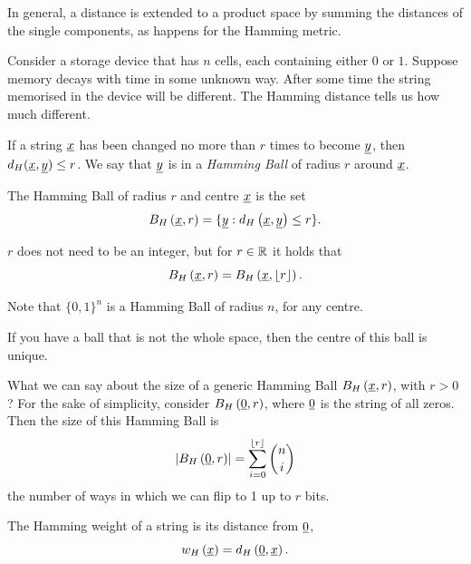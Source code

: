 In general,  a distance is extended to a product space by summing the distances of the single components, as happens for the Hamming metric.

Consider a storage device that has $n$ cells, each containing either $0$ or $1$.
Suppose memory decays with time in some unknown way.
After some time the string memorised in the device will be different.
The Hamming distance tells us how much different.

If a string $\underline{x}$ has been changed no more than $r$ times to become $\underline{y}$, then $d_H(\underline{x}, \underline{y}) \leq r$.
We say that $\underline{y}$ is in a \emph{Hamming Ball} of radius $r$ around $\underline{x}$.

\begin{definition}
	The Hamming Ball of radius $r$ and centre $\underline{x}$ is the set
	\begin{equation}
		B_H\left(\underline{x}, r\right) = \{\underline{y} : d_H \left({\underline{x},\underline{y}}\right) \leq r\}.
	\end{equation}
\end{definition}

\begin{obs}
	$r$ does not need to be an integer, but for $r \in \mathbb{R}$ it holds that
	\begin{equation*}
		B_H\left(\underline{x}, r\right) = B_H\left(\underline{x}, \left\lfloor{r}\right\rfloor\right).
	\end{equation*}
\end{obs}

Note that $\{0,1\}^{n}$ is a Hamming Ball of radius $n$, for any centre.

If you have a ball that is not the whole space, then the centre of this ball is unique.

What we can say about the size of a generic Hamming Ball $B_H\left(\underline{x}, r\right)$, with $r > 0$?
For the sake of simplicity, consider $B_H\left(\underline{0}, r\right)$, where $\underline{0}$ is the string of all zeros.
Then the size of this Hamming Ball is
\begin{equation}\label{eq:volume}
	\left|{B_H\left(\underline{0}, r\right)}\right| = \sum_{i = 0}^{\left\lfloor{r}\right\rfloor} \binom{n}{i}
\end{equation}
\ie the number of ways in which we can flip to 1 up to $r$ bits.

\begin{definition}
	The Hamming weight of a string is its distance from $\underline{0}$, \ie
	\begin{equation}
	w_H\left(\underline{x}\right) = d_H \left({\underline{0},\underline{x}}\right).
	\end{equation}
\end{definition}

